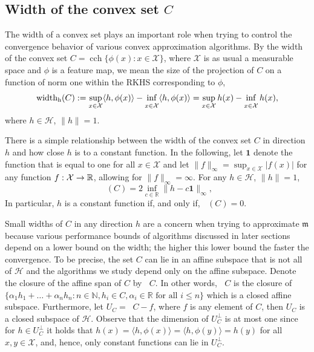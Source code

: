 \documentclass[AHL,Unicode,longabstracts,published]{cedram}
\theoremstyle{remark}
\DeclareMathOperator*{\infd}{inf\vphantom{p}}
\DeclareMathOperator{\cch}{cch}
\DeclareMathOperator{\caff}{\overline{aff}}
\DeclareMathOperator{\diamh}{{width}_h}
\newcommand{\R}{\mathbb{R}}
\newcommand{\bbN}{\mathbb{N}}
\newcommand{\X}{\mathcal{X}}
\newcommand{\cH}{\mathcal{H}}
\newcommand{\mean}{\mathfrak{m}}
\renewcommand*{\to}{\mathchoice{\longrightarrow}{\rightarrow}{\rightarrow}{\rightarrow}}
\begin{document}
\subsection{Width of the convex set \texorpdfstring{$C$}{C}} \label{sec:diameter}
The width of a convex set plays an important role when trying to control the convergence behavior of various convex approximation algorithms. By the width of the convex set $C = \cch\{\phi(x) : x \in \X\}$, where $\X$ is as usual a measurable space and $\phi$ is a feature map, we mean the size of the projection of $C$ on a function of norm one within the RKHS corresponding to $\phi$,
\[
\diamh(C) := \sup_{x\in \X} \langle h, \phi(x) \rangle - \infd_{x\in \X} \langle h, \phi(x) \rangle =
\sup_{x\in \X} h(x) - \infd_{x\in \X} h(x),
\]
where $h \in \cH$, $\|h\| =1 $.

There is a simple relationship between the width of the convex set $C$ in direction $h$ and how close $h$ is to a constant function. In the following, let $\bm 1$ denote the function that is equal to one for all $x\in \X$ and let $\| f\|_\infty =
\sup_{x\in \X} |f(x)|$ for any function $f: \X \to \R$, allowing for $\|f\|_\infty = \infty$. For any $h\in \cH$, $\|h \| =1$,
\begin{equation}\label{eq:constant_vs_diameter}
\diamh(C) = 2 \inf_{c\in \R} \|h - c \bm 1\|_\infty,
\end{equation}
In particular, $h$ is a constant function if, and only if, $\diamh(C) = 0$.

Small widths of $C$ in any direction $h$ are a concern when trying to approximate $\mean$ because various performance bounds of algorithms discussed in later sections depend on a lower bound on the width; the higher this lower bound the faster the convergence. To be precise, the set $C$ can lie in an affine subspace that is not all of $\cH$ and the algorithms we study depend only on the affine subspace. Denote the closure of the affine span of $C$ by $\caff C$. In other words, $\caff C$ is the closure of $\{\alpha_1 h_1 + \dots + \alpha_n h_n : n\in \bbN, h_i \in C, \alpha_i \in \R \text{ for all } i \leq n \}$ which is a closed affine subspace. Furthermore, let $U_C = \caff C - f$, where $f$ is any element of $C$, then $U_C$ is a closed subspace of $\cH$. Observe that the dimension of $U_C^\perp$ is at most one since for $h \in U_C^\perp$ it holds that $h(x) = \langle h,\phi(x) \rangle = \langle h, \phi(y) \rangle = h(y)$ for all $x,y \in \X$, and, hence, only constant functions can lie in $U_C^\perp$.
\end{document}
